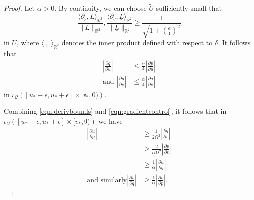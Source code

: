 \documentclass{article}
\newcommand{\Q}{\mathcal{Q}}
\newcommand{\R}{\mathbb{R}}
\begin{document}
\begin{proof}
Let $\alpha>0$. By continuity, we can choose $\tilde{U}$ sufficiently small that 
\begin{equation}
    \frac{\langle\partial_p,L\rangle_{\R^2}}{\lVert L\rVert_{\R^2}},\frac{\langle\partial_q,\underline{L}\rangle_{\R^2}}{\lVert \underline{L}\rVert_{\R^2}}\geq\frac{1}{\sqrt{1+\left(\frac{\alpha}{4}\right)^2}}
\end{equation}
in $\tilde{U}$, where $\langle.,.\rangle_{\R^2}$ denotes the inner product defined with respect to $\delta$.
It follows that
\begin{equation}\label{eqn:gradientcontrol}
    \begin{split}
        \left|\frac{\partial q}{\partial u}\right|&\leq\frac{\alpha}{4} \left|\frac{\partial p}{\partial u}\right|\\
        \text{and }\left|\frac{\partial p}{\partial v}\right|&\leq\frac{\alpha}{4}\left|\frac{\partial q}{\partial v}\right|
    \end{split}
\end{equation}
in $\iota_\Q\left([u_*-\epsilon,u_*+\epsilon]\times[v_*,0)\right)$.



Combining \eqref{eqn:derivbounds} and \eqref{eqn:gradientcontrol}, it follows that in $\iota_\Q\left([u_*-\epsilon,u_*+\epsilon]\times[v_*,0)\right)$ we have
\begin{equation}
    \begin{split}
                \left|\frac{\partial u}{\partial p}\right|&\geq\frac{1}{ 2\Omega^2}\left|\frac{\partial q}{\partial v}\right|\\
                &\geq\frac{2}{\alpha\Omega^2}\left|\frac{\partial p}{\partial v}\right|\\
                &\geq  \frac{1}{\alpha}\left|\frac{\partial u}{\partial q}\right| \\
        \text{and similarly}\left|\frac{\partial v}{\partial q}\right|&\geq \frac{1}{\alpha}\left|\frac{\partial v}{\partial p}\right|.
    \end{split}
\end{equation}
\end{proof}
\end{document}
